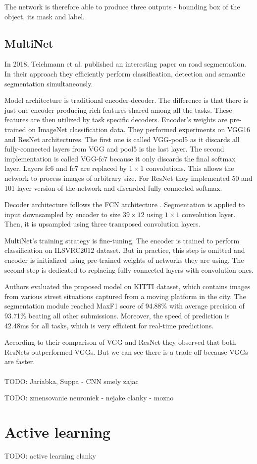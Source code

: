 The network is therefore able to produce three outputs - bounding box of the object,
its mask and label.

\subsection{MultiNet}
\label{sec:semantic_seg_cnn:multinet}

In 2018, Teichmann et al. \cite{bib:teichmann2018multinet} published an interesting
paper on road segmentation. In their approach they efficiently perform
classification, detection and semantic segmentation simultaneously.

Model architecture is traditional encoder-decoder. The difference is that there
is just one encoder producing rich features shared among all the tasks. These features
are then utilized by task specific decoders.
Encoder's weights are pre-trained on ImageNet classification data. They performed
experiments on VGG16 and ResNet architectures. The first one is called VGG-pool5
as it discards all fully-connected layers from VGG and pool5 is the last layer.
The second implementation is called VGG-fc7 because it only discards the final softmax
layer. Layers fc6 and fc7 are replaced by $1\times1$ convolutions. This allows the
network to process images of arbitrary size. For ResNet they implemented 50 and 101
layer version of the network and discarded fully-connected softmax.

Decoder architecture follows the FCN architecture \cite{bib:long2015fully}.
Segmentation is applied to input
downsampled by encoder to size $39\times12$ using $1\times1$ convolution layer. Then,
it is upsampled using three transposed convolution layers.

MultiNet's training strategy is fine-tuning. The encoder is trained to perform
classification on ILSVRC2012 dataset. But in practice, this step is omitted and
encoder is initialized using pre-trained weights of networks they are using.
The second step is dedicated to replacing fully connected layers with
convolution ones.

Authors evaluated the proposed model on KITTI dataset, which contains images
from various street situations captured from a moving platform in the city.
The segmentation module reached MaxF1 score of 94.88\% with average precision of
93.71\% beating all other submissions. Moreover, the speed of prediction is 42.48ms
for all tasks, which is very efficient for real-time predictions.

According to their comparison of VGG and ResNet they observed that both ResNets
outperformed VGGs. But we can see there is a trade-off because VGGs are faster.
\\
\\


TODO: Jariabka, Suppa - CNN smely zajac 

TODO: zmensovanie neuroniek - nejake clanky - mozno


\section{Active learning}
\label{sec:active_learning_rw}

TODO: active learning clanky